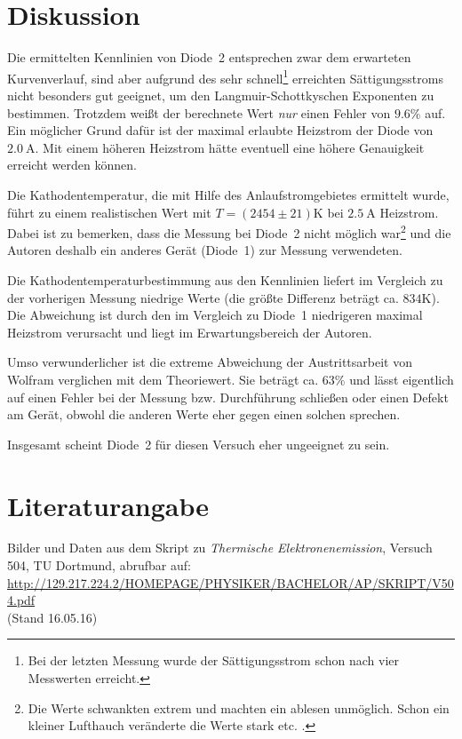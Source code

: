 \section{Diskussion}
\label{sec:Diskussion}

Die ermittelten Kennlinien von Diode~2 entsprechen zwar dem erwarteten Kurvenverlauf, sind aber aufgrund des sehr schnell\footnote{Bei der letzten Messung wurde der Sättigungsstrom schon nach vier Messwerten erreicht.} erreichten Sättigungsstroms nicht besonders gut geeignet, um den Langmuir-Schottkyschen Exponenten zu bestimmen. Trotzdem weißt der berechnete Wert \emph{nur} einen Fehler von $9.6\%$ auf. Ein möglicher Grund dafür ist der maximal erlaubte Heizstrom der Diode von $\SI{2.0}{\ampere}$. Mit einem höheren Heizstrom hätte eventuell eine höhere Genauigkeit erreicht werden können.

Die Kathodentemperatur, die mit Hilfe des Anlaufstromgebietes ermittelt wurde, führt zu einem realistischen Wert mit $T = (2454 \pm 21) \si{\kelvin}$ bei $\SI{2.5}{\ampere}$ Heizstrom. Dabei ist zu bemerken, dass die Messung bei Diode~2 nicht möglich war\footnote{Die Werte schwankten extrem und machten ein ablesen unmöglich. Schon ein kleiner Lufthauch veränderte die Werte stark etc. .} und die Autoren deshalb ein anderes Gerät (Diode~1) zur Messung verwendeten.

Die Kathodentemperaturbestimmung aus den Kennlinien liefert im Vergleich zu der vorherigen Messung niedrige Werte (die größte Differenz beträgt ca. $834\si{\kelvin}$). Die Abweichung ist durch den im Vergleich zu Diode~1 niedrigeren maximal Heizstrom verursacht und liegt im Erwartungsbereich der Autoren.

Umso verwunderlicher ist die extreme Abweichung der Austrittsarbeit von Wolfram verglichen mit dem Theoriewert. Sie beträgt ca. $63\%$ und lässt eigentlich auf einen Fehler bei der Messung bzw. Durchführung schließen oder einen Defekt am Gerät, obwohl die anderen Werte eher gegen einen solchen sprechen.

Insgesamt scheint Diode~2 für diesen Versuch eher ungeeignet zu sein.




\newpage
\section{Literaturangabe}
\label{sec:Literatur}

Bilder und Daten aus dem Skript zu \emph{Thermische Elektronenemission}, Versuch 504, TU Dortmund, abrufbar auf:\\
\url{http://129.217.224.2/HOMEPAGE/PHYSIKER/BACHELOR/AP/SKRIPT/V504.pdf}\\(Stand 16.05.16)\par

